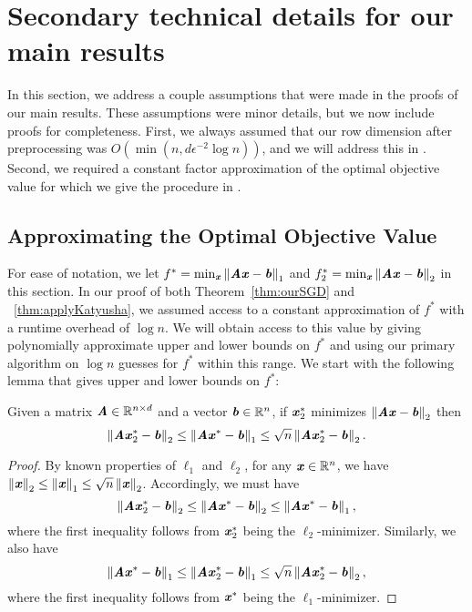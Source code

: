 \section{Secondary technical details for our main results}\label{sec:minor_details}

In this section, we address a couple assumptions that were made in the proofs of our main results. These assumptions were minor details, but we now include proofs for completeness.
First, we always assumed that our row dimension after preprocessing was $O(\min(n,d\epsilon^{-2}\log n))$, and we will address this in . Second, we required a constant factor approximation of the optimal objective value for which we give the procedure in .


\subsection{Approximating the Optimal Objective Value}\label{subsec:binarySearch}

For ease of notation, we let $f^* = \min_{\xx} \norm{\AA\xx - \bb}_1$ and $f_2^* = \min_{\xx} \norme{\AA\xx - \bb}$ in this section.
In our proof of both Theorem~\ref{thm:ourSGD} and ~\ref{thm:applyKatyusha}, we assumed access to a constant approximation of $f^*$ with a runtime overhead of $\log{n}$.
We will obtain access to this value by giving polynomially approximate upper and lower bounds on $f^*$ and using our primary algorithm on $\log{n}$ guesses for $f^*$ within this range.
We start with the following lemma that gives upper and lower bounds on $f^*$:

\begin{lemma}\label{lem:approxOfObjectiveVal}
	Given a matrix $\AA \in \R^{n \times d}$ and a vector $\bb \in \R^n$, if $\xx_2^*$ minimizes $\norme{\AA\xx-\bb}$ then
	\[ 
	\norme{\AA\xx_2^* - \bb} \leq \norm{\AA\xx^* - \bb}_1 \leq \sqrt{n}\norme{\AA\xx_2^* - \bb}.
	\]
\end{lemma}

\begin{proof}
	By known properties of $\ell_1$ and $\ell_2$, for any $\xx \in \R^n$, we have $\norm{\xx}_2 \leq \norm{\xx}_1 \leq \sqrt{n}\norm{\xx}_2$.
	Accordingly, we must have 
	\[
	\norme{\AA\xx_2^* - \bb} \leq \norme{\AA\xx^* - \bb} \leq \norm{\AA\xx^* - \bb}_1,
	\]
	where the first inequality follows from $\xx_2^*$ being the $\ell_2$-minimizer. Similarly, we also have 
	\[
	\norm{\AA\xx^* - \bb}_1 \leq \norm{\AA\xx_2^* - \bb}_1 \leq \sqrt{n}\norme{\AA\xx_2^* - \bb},
	\]
	where the first inequality follows from $\xx^*$ being the $\ell_1$-minimizer.
\end{proof}

